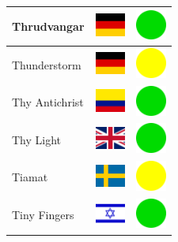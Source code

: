 \documentclass[12pt, a4paper, twoside]{report}
\begin{document}
\begin{center}
\begin{longtable}{|p{5cm}|p{2cm}|p{2cm}|}
 Thrudvangar                                                & \includegraphics[width=1cm]{../img/flags/de} &   \includegraphics[width=1cm]{../likes/y} \\ \hline
 Thunderstorm                                               & \includegraphics[width=1cm]{../img/flags/de} &   \includegraphics[width=1cm]{../likes/m} \\ \hline
 Thy Antichrist                                             & \includegraphics[width=1cm]{../img/flags/co} &   \includegraphics[width=1cm]{../likes/y} \\ \hline
 Thy Light                                                  & \includegraphics[width=1cm]{../img/flags/gb} &   \includegraphics[width=1cm]{../likes/y} \\ \hline
 Tiamat                                                     & \includegraphics[width=1cm]{../img/flags/se} &   \includegraphics[width=1cm]{../likes/m} \\ \hline
 Tiny Fingers                                               & \includegraphics[width=1cm]{../img/flags/il} &   \includegraphics[width=1cm]{../likes/y} \\ \hline

\end{longtable}
\end{center}
\end{document}
